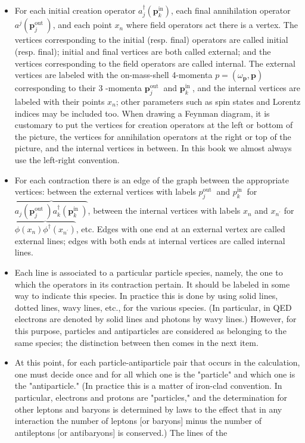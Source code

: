 \documentclass[10pt, letterpaper]{article}
\begin{document}
\begin{itemize}
  \item For each initial creation operator $a_{j}^{\dagger}\left(\mathbf{p}_{k}^{\mathrm{in}}\right)$, each final annihilation operator $a^{j}\left(\mathbf{p}_{j}^{\text {out }}\right)$, and each point $x_{n}$ where field operators act there is a vertex. The vertices corresponding to the initial (resp. final) operators are called initial (resp. final); initial and final vertices are both called external; and the vertices corresponding to the field operators are called internal. The external vertices are labeled with the on-mass-shell 4-momenta $p=\left(\omega_{\mathbf{p}}, \mathbf{p}\right)$ corresponding to their 3 -momenta $\mathbf{p}_{j}^{\text {out }}$ and $\mathbf{p}_{k}^{\text {in }}$, and the internal vertices are labeled with their points $x_{n}$; other parameters such as spin states and Lorentz indices may be included too. When drawing a Feynman diagram, it is customary to put the vertices for creation operators at the left or bottom of the picture, the vertices for annihilation operators at the right or top of the picture, and the internal vertices in between. In this book we almost always use the left-right convention.
  \item For each contraction there is an edge of the graph between the appropriate vertices: between the external vertices with labels $p_{j}^{\text {out }}$ and $p_{k}^{\text {in }}$ for $\overbrace{a_{j}\left(\mathbf{p}_{j}^{\text {out }}\right) a_{k}^{\dagger}\left(\mathbf{p}_{k}^{\text {in }}\right)}$, between the internal vertices with labels $x_{n}$ and $x_{n^{\prime}}$ for $\overbrace{\phi\left(x_{n}\right) \phi^{\dagger}\left(x_{n^{\prime}}\right)}$, etc. Edges with one end at an external vertex are called external lines; edges with both ends at internal vertices are called internal lines.
  \item Each line is associated to a particular particle species, namely, the one to which the operators in its contraction pertain. It should be labeled in some way to indicate this species. In practice this is done by using solid lines, dotted lines, wavy lines, etc., for the various species. (In particular, in QED electrons are denoted by solid lines and photons by wavy lines.) However, for this purpose, particles and antiparticles are considered as belonging to the same species; the distinction between then comes in the next item.
  \item At this point, for each particle-antiparticle pair that occurs in the calculation, one must decide once and for all which one is the "particle" and which one is the "antiparticle." (In practice this is a matter of iron-clad convention. In particular, electrons and protons are "particles," and the determination for other leptons and baryons is determined by laws to the effect that in any interaction the number of leptons [or baryons] minus the number of antileptons [or antibaryons] is conserved.) The lines of the\\

\end{itemize}
\end{document}
